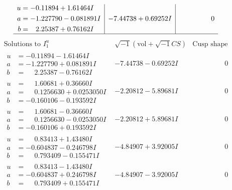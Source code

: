 \documentclass[1p]{elsarticle_modified}
\theoremstyle{definition}
\newcommand{\I}{\sqrt{-1}}
\begin{document}
$$\begin{array}{c|c|c}
\begin{aligned}
u &= -0.11894 + 1.61464 I \\
a &= -1.227790 - 0.081891 I \\
b &= \phantom{-}2.25387 + 0.76162 I\end{aligned}
 & -7.44738 + 0.69252 I & \phantom{-0.000000 } 0\\
 \hline 
 \end{array}$$\newpage$$\begin{array}{c|c|c}  
\text{Solutions to }I^u_{1}& \I (\text{vol} + \sqrt{-1}CS) & \text{Cusp shape}\\
 \hline 
\begin{aligned}
u &= -0.11894 - 1.61464 I \\
a &= -1.227790 + 0.081891 I \\
b &= \phantom{-}2.25387 - 0.76162 I\end{aligned}
 & -7.44738 - 0.69252 I & \phantom{-0.000000 } 0 \\ \hline\begin{aligned}
u &= \phantom{-}1.60681 + 0.36660 I \\
a &= \phantom{-}0.1256630 + 0.0253050 I \\
b &= -0.160106 - 0.193592 I\end{aligned}
 & -2.20812 - 5.89681 I & \phantom{-0.000000 } 0 \\ \hline\begin{aligned}
u &= \phantom{-}1.60681 - 0.36660 I \\
a &= \phantom{-}0.1256630 - 0.0253050 I \\
b &= -0.160106 + 0.193592 I\end{aligned}
 & -2.20812 + 5.89681 I & \phantom{-0.000000 } 0 \\ \hline\begin{aligned}
u &= \phantom{-}0.83413 + 1.43480 I \\
a &= -0.604837 - 0.246798 I \\
b &= \phantom{-}0.793409 - 0.155471 I\end{aligned}
 & -4.84907 + 3.92005 I & \phantom{-0.000000 } 0 \\ \hline\begin{aligned}
u &= \phantom{-}0.83413 - 1.43480 I \\
a &= -0.604837 + 0.246798 I \\
b &= \phantom{-}0.793409 + 0.155471 I\end{aligned}
 & -4.84907 - 3.92005 I & \phantom{-0.000000 } 0 \\ \hline\begin{aligned}

\end{aligned}
\end{array}$$
\end{document}
